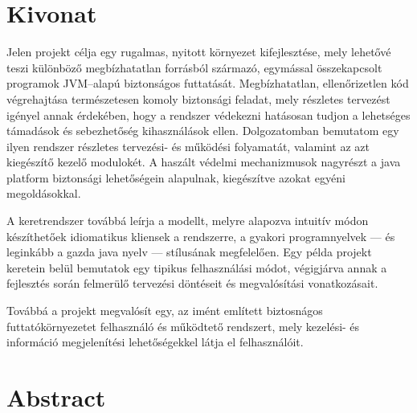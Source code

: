 
%

\chapter*{Kivonat}

Jelen projekt célja egy rugalmas, nyitott környezet kifejlesztése, mely lehetővé teszi különböző megbízhatatlan forrásból származó, egymással összekapcsolt programok JVM--alapú biztonságos futtatását. Megbízhatatlan, ellenőrizetlen kód végrehajtása természetesen komoly biztonsági feladat, mely részletes tervezést igényel annak érdekében, hogy a rendszer védekezni hatásosan tudjon a lehetséges támadások és sebezhetőség kihasználások ellen. Dolgozatomban bemutatom egy ilyen rendszer részletes tervezési- és működési folyamatát, valamint az azt kiegészítő kezelő modulokét. A haszált védelmi mechanizmusok nagyrészt a java platform biztonsági lehetőségein alapulnak, kiegészítve azokat egyéni megoldásokkal.

A keretrendszer továbbá leírja a modellt, melyre alapozva intuitív módon készíthetőek idiomatikus kliensek a rendszerre, a gyakori programnyelvek --- és leginkább a gazda java nyelv --- stílusának megfelelően. Egy példa projekt keretein belül bemutatok egy tipikus felhasználási módot, végigjárva annak a fejlesztés során felmerülő tervezési döntéseit és megvalósítási vonatkozásait. 

Továbbá a projekt megvalósít egy, az imént említett biztosnágos futtatókörnyezetet felhasználó és működtető rendszert, mely kezelési- és információ megjelenítési lehetőségekkel látja el felhasználóit. 


\chapter*{Abstract}

